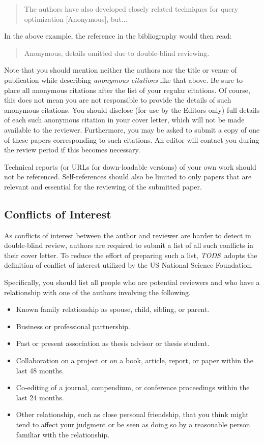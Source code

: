 \documentclass[acmtods,acmnow]{acmtrans2m}
\newcommand{\tods}{{\em TODS\/}}
\begin{document}
\begin{quotation}
The
authors have also developed closely related techniques for query
optimization [Anonymous], but...
\end{quotation}

\noindent
In the above example, the reference in the bibliography would then read:

\begin{quotation}
{\sc Anonymous}, details omitted due to double-blind reviewing.
\end{quotation}

Note that you should mention neither the authors nor the title or venue of
publication while describing {\em anonymous citations} like that above. Be
sure to place all anonymous citations after the list of your regular
citations. Of course, this does not mean you are not responsible to provide
the details of such anonymous citations. You should disclose (for use by the
Editors only) full details of each such anonymous citation in your cover
letter, which will not be made available to the reviewer. Furthermore, you
may be asked to submit a copy of one of these papers corresponding to such
citations. An editor will contact you during the review period if this
becomes necessary.

Technical reports (or URLs for down-loadable versions) of your own work
should not be referenced. Self-references should also be limited to only
papers that are relevant and essential for the reviewing of the
submitted paper.

\subsection{Conflicts of Interest}
As conflicts of interest between the author and reviewer are harder to
detect in double-blind review, authors are required to submit a list of all such conflicts in their
cover letter. To reduce the effort of preparing such a list, \tods\ adopts the
definition of conflict of interest utilized by the US National Science
Foundation.

Specifically, you should list all people who are potential reviewers and who
have a relationship with one of the authors involving the following.
\begin{itemize}
\item Known family relationship as spouse, child, sibling, or parent.
\item Business or professional partnership.
\item Past or present association as thesis advisor or thesis student.
\item Collaboration on a project or on a book, article, report, or paper within the last 48 months.
\item Co-editing of a journal, compendium, or conference proceedings within the last 24 months.
\item Other relationship, such as close personal friendship, that you think
might tend to affect your judgment or be seen as doing so by a reasonable
person familiar with the relationship.
\end{itemize}
\end{document}
